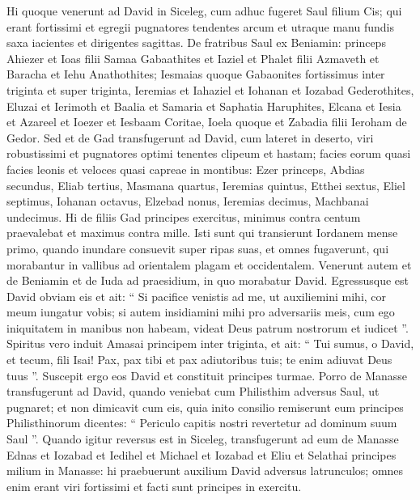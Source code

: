 \begin{biblechapter}
\begin{biblechapter}
\begin{biblechapter}
\begin{biblechapter}
\begin{biblechapter}
\begin{biblechapter}
\begin{biblechapter}
\begin{biblechapter}
\begin{biblechapter}
\begin{biblechapter}
\begin{biblechapter}
\begin{biblechapter}
\verse Hi quoque venerunt ad David in Siceleg, cum adhuc fugeret Saul filium Cis; qui erant fortissimi et egregii pugnatores 
\verse tendentes arcum et utraque manu fundis saxa iacientes et dirigentes sagittas. De fratribus Saul ex Beniamin: 
\verse princeps Ahiezer et Ioas filii Samaa Gabaathites et Iaziel et Phalet filii Azmaveth et Baracha et Iehu Anathothites; 
\verse Iesmaias quoque Gabaonites fortissimus inter triginta et super triginta, 
\verse Ieremias et Iahaziel et Iohanan et Iozabad Gederothites, 
\verse Eluzai et Ierimoth et Baalia et Samaria et Saphatia Haruphites, 
\verse Elcana et Iesia et Azareel et Ioezer et Iesbaam Coritae, 
\verse Ioela quoque et Zabadia filii Ieroham de Gedor.
 \verse Sed et de Gad transfugerunt ad David, cum lateret in deserto, viri robustissimi et pugnatores optimi tenentes clipeum et hastam; facies eorum quasi facies leonis et veloces quasi capreae in montibus: 
\verse Ezer princeps, Abdias secundus, Eliab tertius, 
\verse Masmana quartus, Ieremias quintus, 
\verse Etthei sextus, Eliel septimus, 
\verse Iohanan octavus, Elzebad nonus, 
\verse Ieremias decimus, Machbanai undecimus. 
\verse Hi de filiis Gad principes exercitus, minimus contra centum praevalebat et maximus contra mille. 
\verse Isti sunt qui transierunt Iordanem mense primo, quando inundare consuevit super ripas suas, et omnes fugaverunt, qui morabantur in vallibus ad orientalem plagam et occidentalem.
 \verse Venerunt autem et de Beniamin et de Iuda ad praesidium, in quo morabatur David. 
\verse Egressusque est David obviam eis et ait: “ Si pacifice venistis ad me, ut auxiliemini mihi, cor meum iungatur vobis; si autem insidiamini mihi pro adversariis meis, cum ego iniquitatem in manibus non habeam, videat Deus patrum nostrorum et iudicet ”. 
\verse Spiritus vero induit Amasai principem inter triginta, et ait:
 “ Tui sumus, o David,
 et tecum, fili Isai!
 Pax, pax tibi
 et pax adiutoribus tuis;
 te enim adiuvat Deus tuus ”.
 Suscepit ergo eos David et constituit principes turmae.
 \verse Porro de Manasse transfugerunt ad David, quando veniebat cum Philisthim adversus Saul, ut pugnaret; et non dimicavit cum eis, quia inito consilio remiserunt eum principes Philisthinorum dicentes: “ Periculo capitis nostri revertetur ad dominum suum Saul ”. 
\verse Quando igitur reversus est in Siceleg, transfugerunt ad eum de Manasse Ednas et Iozabad et Iedihel et Michael et Iozabad et Eliu et Selathai principes milium in Manasse: 
\verse hi praebuerunt auxilium David adversus latrunculos; omnes enim erant viri fortissimi et facti sunt principes in exercitu. 

\end{biblechapter}
\end{biblechapter}
\end{biblechapter}
\end{biblechapter}
\end{biblechapter}
\end{biblechapter}
\end{biblechapter}
\end{biblechapter}
\end{biblechapter}
\end{biblechapter}
\end{biblechapter}
\end{biblechapter}
